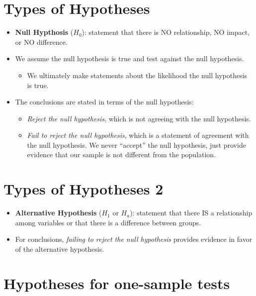\documentclass[12pt]{article}
\begin{document}
\section{Types of Hypotheses}\label{types-of-hypotheses}

\begin{itemize}
\itemsep1pt\parskip0pt
\item
  \textbf{Null Hypthosis} (\(H_{0}\)): statement that there is NO
  relationship, NO impact, or NO difference.
\item
  We assume the null hypothesis is true and test against the null
  hypothesis.

  \begin{itemize}
  \itemsep1pt\parskip0pt
  \item
    We ultimately make statements about the likelihood the null
    hypothesis is true.
  \end{itemize}
\item
  The conclusions are stated in terms of the null hypothesis:

  \begin{itemize}
  \itemsep1pt\parskip0pt
  \item
    \emph{Reject the null hypothesis}, which is not agreeing with the
    null hypothesis.
  \item
    \emph{Fail to reject the null hypothesis}, which is a statement of
    agreement with the null hypothesis. We never ``accept'' the null
    hypothesis, just provide evidence that our sample is not different
    from the population.
  \end{itemize}
\end{itemize}

\section{Types of Hypotheses 2}\label{types-of-hypotheses-2}

\begin{itemize}
\itemsep1pt\parskip0pt
\item
  \textbf{Alternative Hypothesis} (\(H_{1}\) or \(H_{a}\)): statement
  that there IS a relationship among variables or that there is a
  difference between groups.
\item
  For conclusions, \emph{failing to reject the null hypothesis} provides
  evidence in favor of the alternative hypothesis.
\end{itemize}

\section{Hypotheses for one-sample
tests}\label{hypotheses-for-one-sample-tests}
\end{document}
